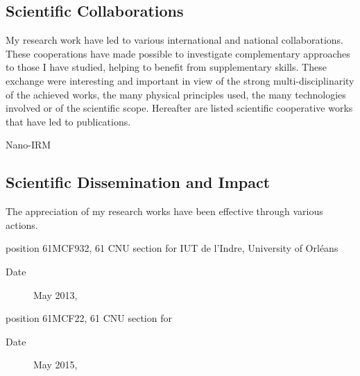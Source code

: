 \SkipAndBreak[2]



\subsection{Scientific Collaborations}\label{sec:CV:coll}

My research work have led to various international and national collaborations.
These cooperations have made possible to investigate complementary approaches to those I have studied, helping to benefit from supplementary skills.
These exchange were interesting and important in view of the strong multi-disciplinarity of the achieved works, the many physical principles used, the many technologies involved or of the scientific scope.
Hereafter  are listed scientific cooperative works that have led to publications.



\begin{enumerate}[leftmargin=3em,format={\sffamily\bfseries\smaller\color{blue2}},label={[COL\arabic*]}]
  \item{}\textsf{Nano-IRM}
\end{enumerate}


\subsection{Scientific Dissemination and Impact}\label{sec:CV:diffusion}

The appreciation of my research works have been effective through various actions.

\begin{enumerate}[leftmargin=3em,format={\sffamily\bfseries\smaller\color{blue2}},label={[MCF\arabic*]}]  
  \item{}position 61MCF932, 61 CNU section for {IUT de l'Indre}, University of Orléans
  \begin{description}
    \item[Date] May 2013, 
  \end{description}
  \item{}position 61MCF22, 61 CNU section for {\INSA \CVL}
  \begin{description}
    \item[Date] May 2015,
  \end{description}
\end{enumerate}

